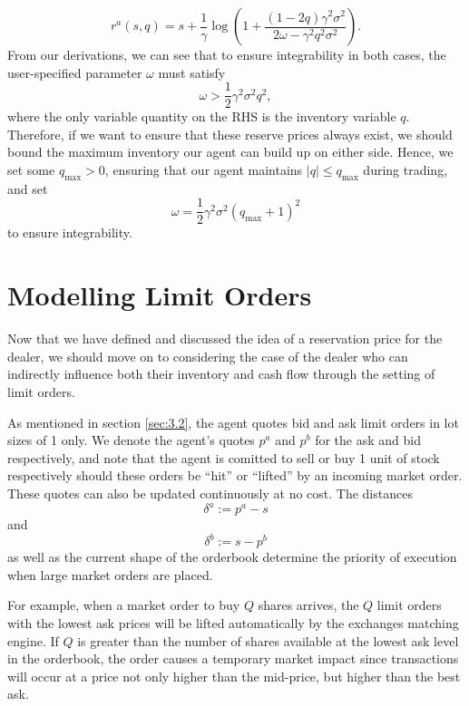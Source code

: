 \begin{equation*}
    r^a(s,q)=s+\frac{1}{\gamma}\log\left(1+\frac{(1-2q)\gamma^2\sigma^2}{2\omega-\gamma^2q^2\sigma^2}\right).
\end{equation*}
From our derivations, we can see that to ensure integrability in both cases, the 
user-specified parameter $\omega$ must satisfy
\begin{equation*}
    \omega>\frac{1}{2}\gamma^2\sigma^2q^2,
\end{equation*}
where the only variable quantity on the RHS is the inventory variable $q$. Therefore,
if we want to ensure that these reserve prices always exist, we should bound the maximum
inventory our agent can build up on either side. Hence, we set some $q_{\textrm{max}}>0$,
ensuring that our agent maintains $|q|\leq q_{\textrm{max}}$ during trading, and set
\begin{equation*}
    \omega=\frac{1}{2}\gamma^2\sigma^2(q_{\textrm{max}}+1)^2
\end{equation*}
to ensure integrability.

\section{Modelling Limit Orders}\label{sec:3.5}
Now that we have defined and discussed the idea of a reservation price
for the dealer, we should move on to considering the case of the dealer
who can indirectly influence both their inventory and cash flow through
the setting of limit orders. 

As mentioned in section \ref{sec:3.2},
the agent quotes bid and ask limit orders in lot sizes of 1 only.
We denote the agent's quotes $p^a$ and $p^b$ for the ask and bid respectively,
and note that the agent is comitted to sell or buy 1 unit of stock respectively
should these orders be ``hit'' or ``lifted'' by an incoming market order.
These quotes can also be updated continuously at no cost. The distances
\begin{equation}
    \delta^a:=p^a-s
\end{equation}
and 
\begin{equation}
    \delta^b:=s-p^b
\end{equation}
as well as the current shape of the orderbook determine the priority 
of execution when large market orders are placed. 

For example, when a market order to buy $Q$ shares arrives, the $Q$ 
limit orders with the lowest ask prices will be lifted automatically
by the exchanges matching engine. If $Q$ is greater than the number
of shares available at the lowest ask level in the orderbook, the order
causes a temporary market impact since transactions will occur at a 
price not only higher than the mid-price, but higher than the best ask.

